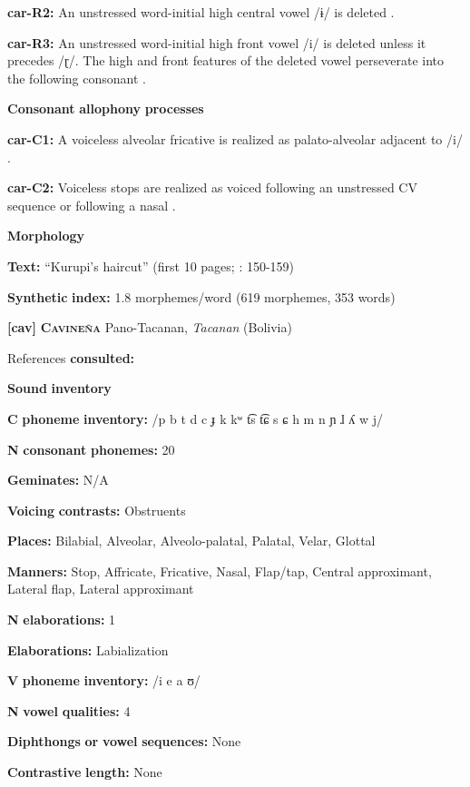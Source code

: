 \textbf{car-R2:} An unstressed word-initial high central vowel /ɨ/ is deleted \citep[40]{Courtz2008}.

\textbf{car-R3:} An unstressed word-initial high front vowel /i/ is deleted unless it precedes /ɽ/. The high and front features of the deleted vowel perseverate into the following consonant \citep[41]{Courtz2008}.

\textbf{Consonant} \textbf{allophony} \textbf{processes}

\textbf{car-C1:} A voiceless alveolar fricative is realized as palato-alveolar adjacent to /i/ \citep[32]{Courtz2008}.

\textbf{car-C2:} Voiceless stops are realized as voiced following an unstressed CV sequence or following a nasal \citep[31]{Courtz2008}.

\textbf{Morphology}

\textbf{Text:} “Kurupi’s haircut” (first 10 pages; \citealt{Courtz2008}: 150-159)

\textbf{Synthetic} \textbf{index:} 1.8 morphemes/word (619 morphemes, 353 words)

\textbf{[cav]}   \textbf{\textsc{Cavineña}  }  Pano-Tacanan, \textit{Tacanan} (Bolivia)

References \textbf{consulted:} \citet{Guillaume2008}

\textbf{Sound} \textbf{inventory}

\textbf{C} \textbf{phoneme} \textbf{inventory:} /p b t d c ɟ k kʷ t͡s t͡ɕ s ɕ h m n ɲ ɺ ʎ w j/

\textbf{N} \textbf{consonant} \textbf{phonemes:} 20

\textbf{Geminates:} N/A

\textbf{Voicing} \textbf{contrasts:} Obstruents

\textbf{Places:} Bilabial, Alveolar, Alveolo-palatal, Palatal, Velar, Glottal

\textbf{Manners:} Stop, Affricate, Fricative, Nasal, Flap/tap, Central approximant, Lateral flap, Lateral approximant

\textbf{N} \textbf{elaborations:} 1

\textbf{Elaborations:} Labialization

\textbf{V} \textbf{phoneme} \textbf{inventory:} /i e a ʊ/

\textbf{N} \textbf{vowel} \textbf{qualities:} 4

\textbf{Diphthongs} \textbf{or} \textbf{vowel} \textbf{sequences:} None

\textbf{Contrastive} \textbf{length:} None

